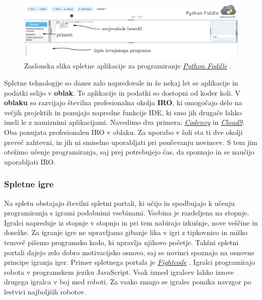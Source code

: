 \begin{figure}[h!]
    \includegraphics [width=1\linewidth, keepaspectratio =
    1] {./images/sc_web/PythonFiddle_01.jpg}
    \caption{Zaslonska slika spletne aplikacije za programiranje
      \emph{\href{http://pythonfiddle.com/}{Python Foddle}}
      \cite{web:pythonfiddle}.}
    \label{fig:scr:web:PyFiddle}
\end{figure}

Spletne tehnologije so danes zalo napredovale in že nekaj let se
aplikacije in podatki selijo v \textbf{oblak}. Te aplikacije in
podatki so dostopni od koder koli. V \textbf{oblaku} so razvijajo
številna profesionalna okolja \textbf{IRO}, ki omogočajo delo na
večjih projektih in ponujajo napredne funkcije IDE, ki smo jih drugače
lahko imeli le z namiznimi aplikacijami. Navedimo dva primera:
\emph{\href{https://codenvy.com/}{Codenvy}} \cite{web:codeenvy} in
\emph{\href{https://c9.io/}{Cloud9}}\cite{web:cloud9}. Oba ponujata
profesionalen IRO v oblaku. Za uporabo v šoli sta ti dve okolji preveč
zahtevni, in jih ni smiselno uporabljati pri poučevanju novincev. S
tem jim otežimo učenje programiranja, saj prej potrebujejo čas, da
spoznajo in se naučijo uporabljati IRO.

\subsubsection{Spletne igre}
\label{sec:spletne_igre}

Na spletu obstajajo številni spletni portali, ki učijo in spodbujajo k
učenju programiranja s igrami podobnimi vsebinami. Vsebina je
razdeljena na stopnje. Igralci napreduje iz stopnje v stopnjo in pri
tem nabirajo izkušnje, nove veščine in dosežke. Za igranje igre ne
upravljamo gibanje lika v igri z tipkovnico in miško temveč pišemo
programsko kodo, ki upravlja njihovo početje. Takšni spletni portali
dajejo zelo dobro motivacijsko osnovo, saj se novinci spoznajo na
osnovne principe igranja iger. Primer spletnega portala je
\emph{\href{http://fightcodegame.com/}{Fightcode}}
\cite{web:fightcode}. Igralci programirajo robota v programskem jeziku
JavaScript. Vsak izmed igralcev lahko izzove drugega igralca v boj med
roboti. Za vsako zmago se igralec pomika navzgor po lestvici
najboljših robotov.

